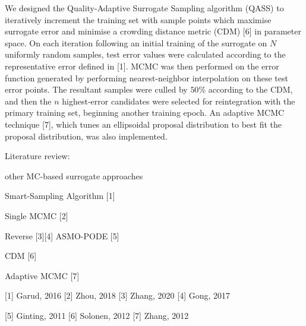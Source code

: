 We designed the Quality-Adaptive Surrogate Sampling algorithm (QASS) to iteratively increment the training set with sample points which maximise surrogate error and minimise a crowding distance metric (CDM) [6] in parameter space. On each iteration following an initial training of the surrogate on $N$ uniformly random samples, test error values were calculated according to the representative error defined in [1]. MCMC was then performed on the error function generated by performing nearest-neighbor interpolation on these test error points. The resultant samples were culled by $50\%$ according to the CDM, and then the $n$ highest-error candidates were selected for reintegration with the primary training set, beginning another training epoch. An adaptive MCMC technique [7], which tunes an ellipsoidal proposal distribution to best fit the proposal distribution, was also implemented.



Literature review:

other MC-based surrogate approaches

Smart-Sampling Algorithm [1]

Single MCMC [2]

Reverse [3][4] ASMO-PODE [5]

CDM [6]

Adaptive MCMC [7]






















[1] Garud, 2016
[2] Zhou, 2018
[3] Zhang, 2020
[4] Gong, 2017

[5] Ginting, 2011
[6] Solonen, 2012
[7] Zhang, 2012




